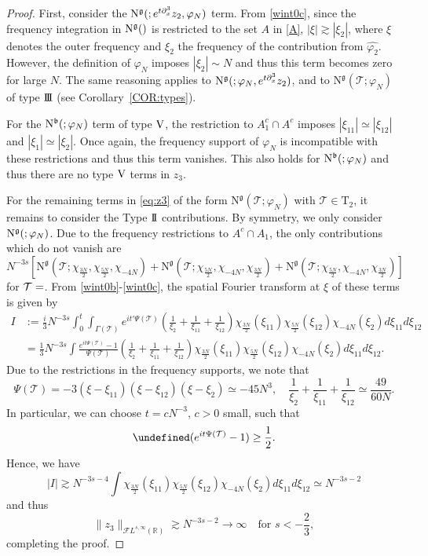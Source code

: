 \documentclass[%
11pt,  reqno]{amsart}
\makeatletter
\newcommand{\II}{\textup{I \hspace{-2.9mm} I} }
\newcommand{\III}{\textup{I \hspace{-2.9mm} I \hspace{-2.9mm} I}}
\newcommand{\5}{\textup{V}}
\newcommand{\ft}{\widehat}
\newcommand{\F}{\mathcal{F}}
\newcommand{\dx}{\partial_x}
\theoremstyle{remark}
\newcommand{\R}{\mathbb{R}}
\let\Re=\undefined\DeclareMathOperator*{\Re}{Re}
\newcommand{\TT}{\mathcal{T}}
\newcommand{\Tr}{\mathrm{T}}
\newcommand{\G}{\Gamma}
\newcommand{\bfrak}{\mathfrak{b}}
\newcommand{\gfrak}{\mathfrak{g}}
\def\<#1>{\csname MH@symb@#1\endcsname}
\numberwithin{equation}{section}
\numberwithin{theorem}{section}
\newcommand{\NN}{\mathrm{N}}
\makeatother
\begin{document}
\begin{proof}
First, consider the $\NN^\gfrak(\<1>; e^{t\dx^3}{z}_2, {\varphi_N})$ term.
From \eqref{wint0c}, since the frequency integration in $\NN^\gfrak(\<1>)$ is restricted to the set $A$ in \eqref{A}, $|\xi|\gtrsim |\xi_2|$, where $\xi$ denotes the outer frequency and $\xi_2$ the frequency of the contribution from $\ft{\varphi_2}$. However, the definition of $\varphi_N$ imposes $|\xi_2|\sim N$ and thus this term becomes zero for large $N$. 
The same reasoning applies to $\NN^\gfrak(\<1>; \varphi_N , e^{t\dx^3}{z}_2)$, and to $\NN^\gfrak(\TT; \varphi_N)$ of type $\III$ (see Corollary~\ref{COR:types}).

    

    
    

    For the $\NN^\bfrak(\<21>; {\varphi_N})$ term of type $\5$, the restriction to $A_1^c\cap A^c$ imposes $|\xi_{11}|\simeq |\xi_{12}|$ and $|\xi_1|\simeq |\xi_2|$. Once again, the frequency support of $\varphi_N$ is incompatible with these restrictions and thus this term vanishes. This also holds for $\NN^\bfrak(\<22>; {\varphi_N})$  and thus there are no type $\5$ terms in $z_3$.

     
    For the remaining terms in \eqref{eq:z3} of the form $\NN^\gfrak(\TT; \varphi_N)$ with $\TT\in \Tr_2$, it remains to consider the Type $\II$ contributions. By symmetry, we only consider $\NN^\gfrak(\<21>; {\varphi_N})$. Due to the frequency restrictions to $A^c \cap A_1$, the only contributions which do not vanish are
    $$
    N^{-3s}\left[\NN^\gfrak\left(\TT; \chi_{\frac{3N}2}, \chi_{\frac{5N}2}, \chi_{-4N}\right) + \NN^\gfrak\left(\TT; \chi_{\frac{5N}2}, \chi_{-4N}, \chi_{\frac{3N}2}\right)+\NN^\gfrak\left(\TT; \chi_{\frac{5N}2}, \chi_{-4N}, \chi_{\frac{3N}2}\right)\right]
    $$
    for $\TT=\<21>$.  From \eqref{wint0b}-\eqref{wint0c}, the spatial Fourier transform at $\xi$ of these terms is given by
    \begin{align}
        I& := \tfrac{i}{3} N^{-3s}\int_0^t
        \int_{\G(\TT)} e^{it'\Psi(\TT)}\left(\frac{1}{\xi_2} + \frac{1}{\xi_{11}}  + \frac{1}{\xi_{12}} \right)\chi_{\frac{3N}2}(\xi_{11})\chi_{\frac{5N}2}(\xi_{12})\chi_{-4N}(\xi_{2})d\xi_{11}d\xi_{12} \\
        & = 
        \tfrac{1}{3}
        N^{-3s}\int \frac{e^{it\Psi(\TT)}-1}{\Psi(\TT)}\left(\frac{1}{\xi_2} + \frac{1}{\xi_{11}}  + \frac{1}{\xi_{12}} \right)\chi_{\frac{3N}2}(\xi_{11})\chi_{\frac{5N}2}(\xi_{12})\chi_{-4N}(\xi_{2})d\xi_{11}d\xi_{12} 
        .
    \end{align}
    Due to the restrictions in the frequency supports, we note that
    $$
     \Psi(\TT)=-3(\xi-\xi_{11})(\xi-\xi_{12})(\xi-\xi_{2}) \simeq -45N^3,\quad \frac{1}{\xi_2} + \frac{1}{\xi_{11}}  + \frac{1}{\xi_{12}} \simeq \frac{49}{60N}. 
    $$
    In particular, we can choose $t=cN^{-3}$, $c>0$ small, such that
    $$
    \Re (e^{it\Psi(\TT)}-1) \ge \frac12.
    $$
    Hence, we have
    $$
    |I|\gtrsim N^{-3s-4}\int \chi_{\frac{3N}2}(\xi_{11})\chi_{\frac{5N}2}(\xi_{12})\chi_{-4N}(\xi_{2})d\xi_{11}d\xi_{12}  \simeq N^{-3s-2}
    $$
    and thus
    $$
    \|z_3\|_{\F L^{s,\infty}(\R)}\gtrsim N^{-3s-2}\to \infty\quad \mbox{for }s<-\frac{2}{3}, 
    $$
    completing the proof. \qedhere

\end{proof}
\end{document}

